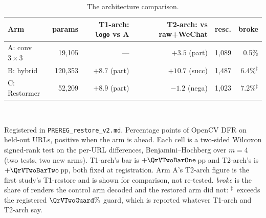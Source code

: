 \begin{table}[htbp]
\centering\small
\caption{The architecture comparison.}
\label{tab:qr_v2}
\setlength{\tabcolsep}{3pt}\footnotesize
\begin{tabular}{lrrrrr}
\toprule
Arm & params & T1-arch: \texttt{logo} vs A & T2-arch: vs raw+WeChat & resc. & broke \\
\midrule
A: conv $3{\times}3$ & 19,105 & --- & $+3.5$ (part) & 1,089 & 0.5\% \\
B: hybrid & 120,353 & $+8.7$ (part) & $+10.7$ (succ) & 1,487 & 6.4\%$^{\ddagger}$ \\
C: Restormer & 52,209 & $+8.9$ (part) & $-1.2$ (nega) & 1,023 & 7.2\%$^{\ddagger}$ \\
\bottomrule
\end{tabular}
\\[4pt]
\begin{minipage}{0.94\linewidth}\footnotesize
Registered in \texttt{PREREG\_restore\_v2.md}. Percentage points of OpenCV DFR on \QrVTwoUrls{}
held-out URLs, positive when the arm is ahead. Each cell is a two-sided Wilcoxon signed-rank test on
the per-URL differences, Benjamini--Hochberg over $m=4$ (two tests, two new arms). T1-arch's bar is
$+\QrVTwoBarOne$\,pp and T2-arch's is $+\QrVTwoBarTwo$\,pp, both fixed at registration. Arm A's
T2-arch figure is the first study's T1-restore and is shown for comparison, not re-tested.
\emph{broke} is the share of renders the control arm decoded and the restored arm did not:
$^{\ddagger}$~exceeds the registered $\QrVTwoGuard\%$ guard, which is reported whatever T1-arch and
T2-arch say.
\end{minipage}
\end{table}
